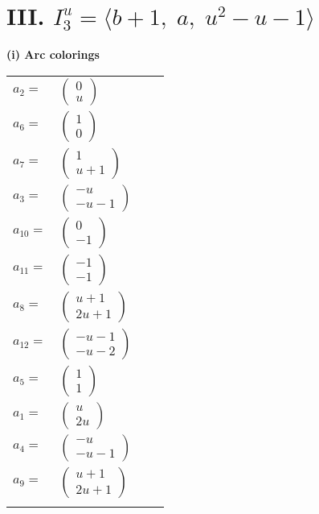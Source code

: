 \documentclass[1p]{elsarticle_modified}
\theoremstyle{definition}
\begin{document}
\centering \section*{III. $I^u_{3}= \langle b+1,\;a,\;u^2- u-1 \rangle$}
\flushleft \textbf{(i) Arc colorings}\\
\begin{tabular}{m{7pt} m{180pt} m{7pt} m{180pt} }
\flushright $a_{2}=$&$\begin{pmatrix}0\\u\end{pmatrix}$ \\
\flushright $a_{6}=$&$\begin{pmatrix}1\\0\end{pmatrix}$ \\
\flushright $a_{7}=$&$\begin{pmatrix}1\\u+1\end{pmatrix}$ \\
\flushright $a_{3}=$&$\begin{pmatrix}- u\\- u-1\end{pmatrix}$ \\
\flushright $a_{10}=$&$\begin{pmatrix}0\\-1\end{pmatrix}$ \\
\flushright $a_{11}=$&$\begin{pmatrix}-1\\-1\end{pmatrix}$ \\
\flushright $a_{8}=$&$\begin{pmatrix}u+1\\2 u+1\end{pmatrix}$ \\
\flushright $a_{12}=$&$\begin{pmatrix}- u-1\\- u-2\end{pmatrix}$ \\
\flushright $a_{5}=$&$\begin{pmatrix}1\\1\end{pmatrix}$ \\
\flushright $a_{1}=$&$\begin{pmatrix}u\\2 u\end{pmatrix}$ \\
\flushright $a_{4}=$&$\begin{pmatrix}- u\\- u-1\end{pmatrix}$ \\
\flushright $a_{9}=$&$\begin{pmatrix}u+1\\2 u+1\end{pmatrix}$\\&\end{tabular}
\end{document}
